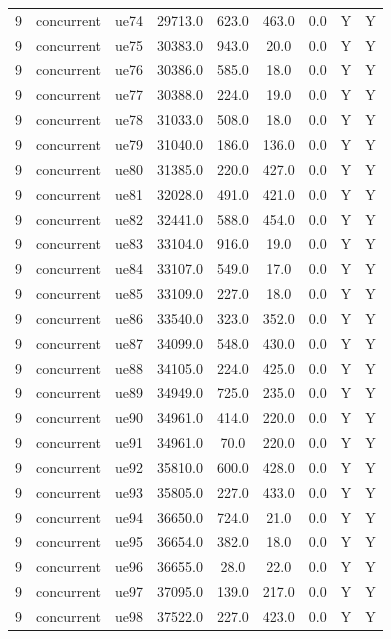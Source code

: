 \begin{table}[ht]
\begin{tabular}{|c|c|c|c|c|c|c|c|c|}
9 & concurrent & ue74 & 29713.0 & 623.0 & 463.0 & 0.0 & Y & Y \\
9 & concurrent & ue75 & 30383.0 & 943.0 & 20.0 & 0.0 & Y & Y \\
9 & concurrent & ue76 & 30386.0 & 585.0 & 18.0 & 0.0 & Y & Y \\
9 & concurrent & ue77 & 30388.0 & 224.0 & 19.0 & 0.0 & Y & Y \\
9 & concurrent & ue78 & 31033.0 & 508.0 & 18.0 & 0.0 & Y & Y \\
9 & concurrent & ue79 & 31040.0 & 186.0 & 136.0 & 0.0 & Y & Y \\
9 & concurrent & ue80 & 31385.0 & 220.0 & 427.0 & 0.0 & Y & Y \\
9 & concurrent & ue81 & 32028.0 & 491.0 & 421.0 & 0.0 & Y & Y \\
9 & concurrent & ue82 & 32441.0 & 588.0 & 454.0 & 0.0 & Y & Y \\
9 & concurrent & ue83 & 33104.0 & 916.0 & 19.0 & 0.0 & Y & Y \\
9 & concurrent & ue84 & 33107.0 & 549.0 & 17.0 & 0.0 & Y & Y \\
9 & concurrent & ue85 & 33109.0 & 227.0 & 18.0 & 0.0 & Y & Y \\
9 & concurrent & ue86 & 33540.0 & 323.0 & 352.0 & 0.0 & Y & Y \\
9 & concurrent & ue87 & 34099.0 & 548.0 & 430.0 & 0.0 & Y & Y \\
9 & concurrent & ue88 & 34105.0 & 224.0 & 425.0 & 0.0 & Y & Y \\
9 & concurrent & ue89 & 34949.0 & 725.0 & 235.0 & 0.0 & Y & Y \\
9 & concurrent & ue90 & 34961.0 & 414.0 & 220.0 & 0.0 & Y & Y \\
9 & concurrent & ue91 & 34961.0 & 70.0 & 220.0 & 0.0 & Y & Y \\
9 & concurrent & ue92 & 35810.0 & 600.0 & 428.0 & 0.0 & Y & Y \\
9 & concurrent & ue93 & 35805.0 & 227.0 & 433.0 & 0.0 & Y & Y \\
9 & concurrent & ue94 & 36650.0 & 724.0 & 21.0 & 0.0 & Y & Y \\
9 & concurrent & ue95 & 36654.0 & 382.0 & 18.0 & 0.0 & Y & Y \\
9 & concurrent & ue96 & 36655.0 & 28.0 & 22.0 & 0.0 & Y & Y \\
9 & concurrent & ue97 & 37095.0 & 139.0 & 217.0 & 0.0 & Y & Y \\
9 & concurrent & ue98 & 37522.0 & 227.0 & 423.0 & 0.0 & Y & Y \\

\end{tabular}
\end{table}
